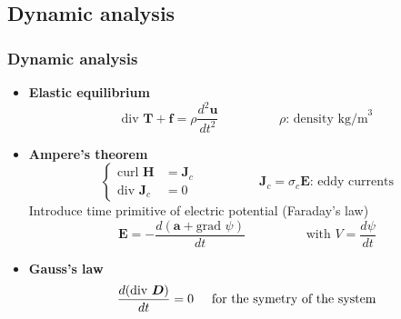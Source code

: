 \documentclass[compress]{beamer}
\begin{document}
\subsection{Dynamic analysis}
\begin{frame}\frametitle{Dynamic analysis}
\begin{itemize}[label=$\bullet$, font=\small, leftmargin=*]
\item \textbf{Elastic equilibrium}
\begin{equation*}
	\text{div }\boldsymbol{T} + \boldsymbol{f} = \rho \frac{d^2 \boldsymbol{u}}{dt^2}
	\hspace{2cm} \rho \text{: density kg/m}^3
	\end{equation*}

\item \textbf{Ampere's theorem}
\begin{equation*}
				\left\{ 
				\begin{aligned}
				\text{curl } \boldsymbol{H} & = \boldsymbol{J}_c \\
				\text{div } \boldsymbol{J}_c & = 0
        		\end{aligned}
				\right.
				\hspace{2cm} \boldsymbol{J}_c = \sigma_c \boldsymbol{E} \text{: eddy currents}
	\end{equation*}
Introduce time primitive of electric potential (Faraday's law)
\begin{equation*}
\boldsymbol{E} = - \frac{d(\boldsymbol{a}+ \text{grad }\psi)}{dt}
\hspace{2cm} \text{with } V=\frac{d \psi}{dt}
\end{equation*}
\item \textbf{Gauss's law}
\begin{equation*}
\frac{d(\text{div } \boldsymbol{D})}{dt} = 0
\hspace{0.5cm} \text{for the symetry of the system} 
\end{equation*}
\end{itemize}
\end{frame}
\end{document}
